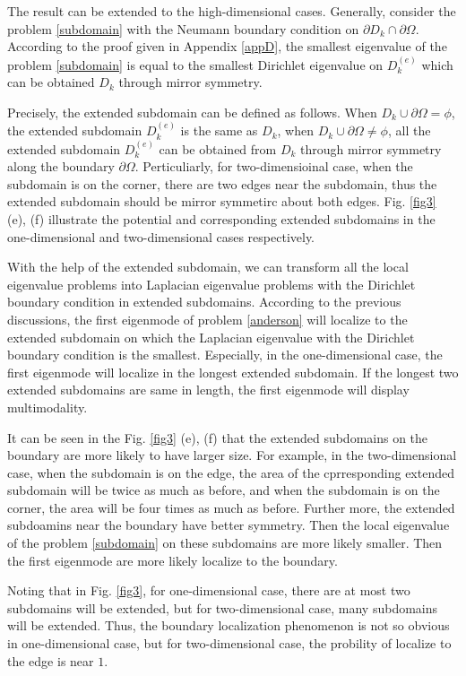 \documentclass[a4paper,11pt]{article}
\begin{document}
The result can be extended to the high-dimensional cases. Generally, consider the problem \eqref{subdomain} with the Neumann boundary condition on $\partial D_k \cap \partial \Omega$. According to the proof given in Appendix \ref{appD}, the smallest eigenvalue of the problem \eqref{subdomain} is equal to the smallest Dirichlet eigenvalue on $D_k^{(e)}$ which can be obtained $D_k$ through mirror symmetry.

Precisely, the extended subdomain can be defined as follows. When $D_k \cup \partial \Omega = \phi$, the extended subdomain $D_k^{(e)}$ is the same as $D_k$, when $D_k \cup \partial \Omega \neq \phi$, all the extended subdomain $D_k^{(e)}$ can be obtained from $D_k$ through mirror symmetry along the boundary $\partial \Omega$. Perticuliarly, for two-dimensioinal case, when the subdomain is on the corner, there are two edges near the subdomain, thus the extended subdomain should be mirror symmetirc about both edges. Fig. \ref{fig3} (e), (f) illustrate the potential and corresponding extended subdomains in the one-dimensional and two-dimensional cases respectively.

With the help of the extended subdomain, we can transform all the local eigenvalue problems into Laplacian eigenvalue problems with the Dirichlet boundary condition in extended subdomains. According to the previous discussions, the first eigenmode of problem \eqref{anderson} will localize to the extended subdomain on which the Laplacian eigenvalue with the Dirichlet boundary condition is the smallest. Especially, in the one-dimensional case, the first eigenmode will localize in the longest extended subdomain. If the longest two extended subdomains are same in length, the first eigenmode will display multimodality.

It can be seen in the Fig. \ref{fig3} (e), (f) that the extended subdomains on the boundary are more likely to have larger size. For example, in the two-dimensional case, when the subdomain is on the edge, the area of the cprresponding extended subdomain will be twice as much as before, and when the subdomain is on the corner, the area will be four times as much as before. Further more, the extended subdoamins near the boundary have better symmetry. Then the local eigenvalue of the problem \eqref{subdomain} on these subdomains are more likely smaller. Then the first eigenmode are more likely localize to the boundary.

Noting that in Fig. \ref{fig3}, for one-dimensional case, there are at most two subdomains will be extended, but for two-dimensional case, many subdomains will be extended. Thus, the boundary localization phenomenon is not so obvious in one-dimensional case, but for two-dimensional case, the probility of localize to the edge is near $1$.
\end{document}
